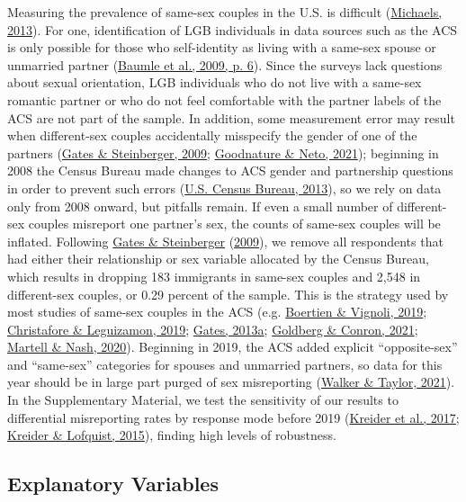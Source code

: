 \documentclass[
  11pt,
]{article}
\begin{document}
Measuring the prevalence of same-sex couples in the U.S. is difficult (\protect\hyperlink{ref-michaels_2013}{Michaels, 2013}). For one, identification of LGB individuals in data sources such as the ACS is only possible for those who self-identity as living with a same-sex spouse or unmarried partner (\protect\hyperlink{ref-baumle_2009}{Baumle et al., 2009, p. 6}). Since the surveys lack questions about sexual orientation, LGB individuals who do not live with a same-sex romantic partner or who do not feel comfortable with the partner labels of the ACS are not part of the sample. In addition, some measurement error may result when different-sex couples accidentally misspecify the gender of one of the partners (\protect\hyperlink{ref-gates_2009}{Gates \& Steinberger, 2009}; \protect\hyperlink{ref-goodnature_2021}{Goodnature \& Neto, 2021}); beginning in 2008 the Census Bureau made changes to ACS gender and partnership questions in order to prevent such errors (\protect\hyperlink{ref-u.s.censusbureau_2013}{U.S. Census Bureau, 2013}), so we rely on data only from 2008 onward, but pitfalls remain. If even a small number of different-sex couples misreport one partner's sex, the counts of same-sex couples will be inflated. Following \protect\hyperlink{ref-gates_2009}{Gates \& Steinberger} (\protect\hyperlink{ref-gates_2009}{2009}), we remove all respondents that had either their relationship or sex variable allocated by the Census Bureau, which results in dropping 183 immigrants in same-sex couples and 2,548 in different-sex couples, or 0.29 percent of the sample. This is the strategy used by most studies of same-sex couples in the ACS (e.g. \protect\hyperlink{ref-boertien_2019}{Boertien \& Vignoli, 2019}; \protect\hyperlink{ref-christafore_2019}{Christafore \& Leguizamon, 2019}; \protect\hyperlink{ref-gates_2013}{Gates, 2013a}; \protect\hyperlink{ref-goldberg_2021}{Goldberg \& Conron, 2021}; \protect\hyperlink{ref-martell_2020}{Martell \& Nash, 2020}). Beginning in 2019, the ACS added explicit ``opposite-sex'' and ``same-sex'' categories for spouses and unmarried partners, so data for this year should be in large part purged of sex misreporting (\protect\hyperlink{ref-walker_2021}{Walker \& Taylor, 2021}). In the Supplementary Material, we test the sensitivity of our results to differential misreporting rates by response mode before 2019 (\protect\hyperlink{ref-kreider_2017}{Kreider et al., 2017}; \protect\hyperlink{ref-kreider_2015}{Kreider \& Lofquist, 2015}), finding high levels of robustness.

\hypertarget{explanatory-variables}{%
\subsection{Explanatory Variables}\label{explanatory-variables}}
\end{document}
